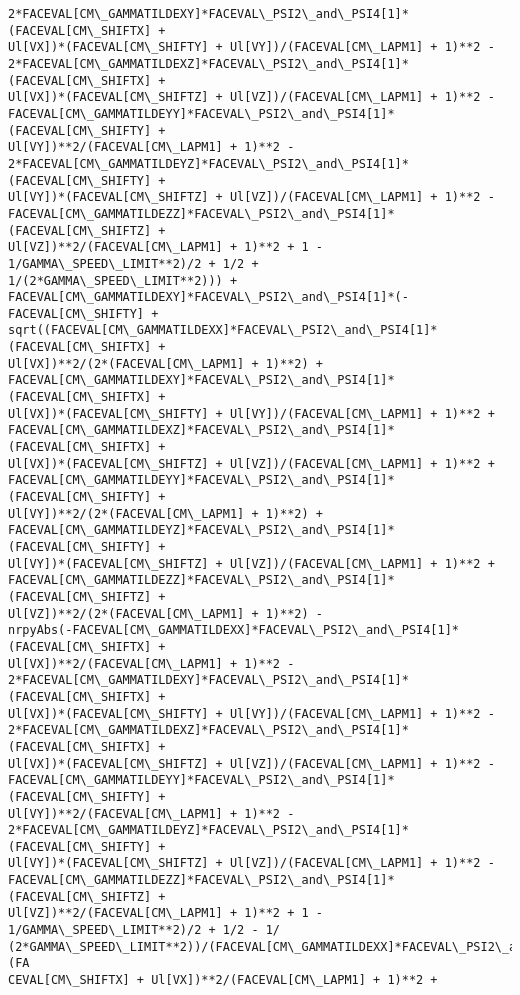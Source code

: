 \documentclass[landscape,letterpaper,10pt,english]{article}
\begin{document}
\begin{Verbatim}[commandchars=\\\{\}]
2*FACEVAL[CM\_GAMMATILDEXY]*FACEVAL\_PSI2\_and\_PSI4[1]*(FACEVAL[CM\_SHIFTX] +
Ul[VX])*(FACEVAL[CM\_SHIFTY] + Ul[VY])/(FACEVAL[CM\_LAPM1] + 1)**2 -
2*FACEVAL[CM\_GAMMATILDEXZ]*FACEVAL\_PSI2\_and\_PSI4[1]*(FACEVAL[CM\_SHIFTX] +
Ul[VX])*(FACEVAL[CM\_SHIFTZ] + Ul[VZ])/(FACEVAL[CM\_LAPM1] + 1)**2 -
FACEVAL[CM\_GAMMATILDEYY]*FACEVAL\_PSI2\_and\_PSI4[1]*(FACEVAL[CM\_SHIFTY] +
Ul[VY])**2/(FACEVAL[CM\_LAPM1] + 1)**2 -
2*FACEVAL[CM\_GAMMATILDEYZ]*FACEVAL\_PSI2\_and\_PSI4[1]*(FACEVAL[CM\_SHIFTY] +
Ul[VY])*(FACEVAL[CM\_SHIFTZ] + Ul[VZ])/(FACEVAL[CM\_LAPM1] + 1)**2 -
FACEVAL[CM\_GAMMATILDEZZ]*FACEVAL\_PSI2\_and\_PSI4[1]*(FACEVAL[CM\_SHIFTZ] +
Ul[VZ])**2/(FACEVAL[CM\_LAPM1] + 1)**2 + 1 - 1/GAMMA\_SPEED\_LIMIT**2)/2 + 1/2 +
1/(2*GAMMA\_SPEED\_LIMIT**2))) +
FACEVAL[CM\_GAMMATILDEXY]*FACEVAL\_PSI2\_and\_PSI4[1]*(-FACEVAL[CM\_SHIFTY] +
sqrt((FACEVAL[CM\_GAMMATILDEXX]*FACEVAL\_PSI2\_and\_PSI4[1]*(FACEVAL[CM\_SHIFTX] +
Ul[VX])**2/(2*(FACEVAL[CM\_LAPM1] + 1)**2) +
FACEVAL[CM\_GAMMATILDEXY]*FACEVAL\_PSI2\_and\_PSI4[1]*(FACEVAL[CM\_SHIFTX] +
Ul[VX])*(FACEVAL[CM\_SHIFTY] + Ul[VY])/(FACEVAL[CM\_LAPM1] + 1)**2 +
FACEVAL[CM\_GAMMATILDEXZ]*FACEVAL\_PSI2\_and\_PSI4[1]*(FACEVAL[CM\_SHIFTX] +
Ul[VX])*(FACEVAL[CM\_SHIFTZ] + Ul[VZ])/(FACEVAL[CM\_LAPM1] + 1)**2 +
FACEVAL[CM\_GAMMATILDEYY]*FACEVAL\_PSI2\_and\_PSI4[1]*(FACEVAL[CM\_SHIFTY] +
Ul[VY])**2/(2*(FACEVAL[CM\_LAPM1] + 1)**2) +
FACEVAL[CM\_GAMMATILDEYZ]*FACEVAL\_PSI2\_and\_PSI4[1]*(FACEVAL[CM\_SHIFTY] +
Ul[VY])*(FACEVAL[CM\_SHIFTZ] + Ul[VZ])/(FACEVAL[CM\_LAPM1] + 1)**2 +
FACEVAL[CM\_GAMMATILDEZZ]*FACEVAL\_PSI2\_and\_PSI4[1]*(FACEVAL[CM\_SHIFTZ] +
Ul[VZ])**2/(2*(FACEVAL[CM\_LAPM1] + 1)**2) -
nrpyAbs(-FACEVAL[CM\_GAMMATILDEXX]*FACEVAL\_PSI2\_and\_PSI4[1]*(FACEVAL[CM\_SHIFTX] +
Ul[VX])**2/(FACEVAL[CM\_LAPM1] + 1)**2 -
2*FACEVAL[CM\_GAMMATILDEXY]*FACEVAL\_PSI2\_and\_PSI4[1]*(FACEVAL[CM\_SHIFTX] +
Ul[VX])*(FACEVAL[CM\_SHIFTY] + Ul[VY])/(FACEVAL[CM\_LAPM1] + 1)**2 -
2*FACEVAL[CM\_GAMMATILDEXZ]*FACEVAL\_PSI2\_and\_PSI4[1]*(FACEVAL[CM\_SHIFTX] +
Ul[VX])*(FACEVAL[CM\_SHIFTZ] + Ul[VZ])/(FACEVAL[CM\_LAPM1] + 1)**2 -
FACEVAL[CM\_GAMMATILDEYY]*FACEVAL\_PSI2\_and\_PSI4[1]*(FACEVAL[CM\_SHIFTY] +
Ul[VY])**2/(FACEVAL[CM\_LAPM1] + 1)**2 -
2*FACEVAL[CM\_GAMMATILDEYZ]*FACEVAL\_PSI2\_and\_PSI4[1]*(FACEVAL[CM\_SHIFTY] +
Ul[VY])*(FACEVAL[CM\_SHIFTZ] + Ul[VZ])/(FACEVAL[CM\_LAPM1] + 1)**2 -
FACEVAL[CM\_GAMMATILDEZZ]*FACEVAL\_PSI2\_and\_PSI4[1]*(FACEVAL[CM\_SHIFTZ] +
Ul[VZ])**2/(FACEVAL[CM\_LAPM1] + 1)**2 + 1 - 1/GAMMA\_SPEED\_LIMIT**2)/2 + 1/2 - 1/
(2*GAMMA\_SPEED\_LIMIT**2))/(FACEVAL[CM\_GAMMATILDEXX]*FACEVAL\_PSI2\_and\_PSI4[1]*(FA
CEVAL[CM\_SHIFTX] + Ul[VX])**2/(FACEVAL[CM\_LAPM1] + 1)**2 +

\end{Verbatim}
\end{document}
